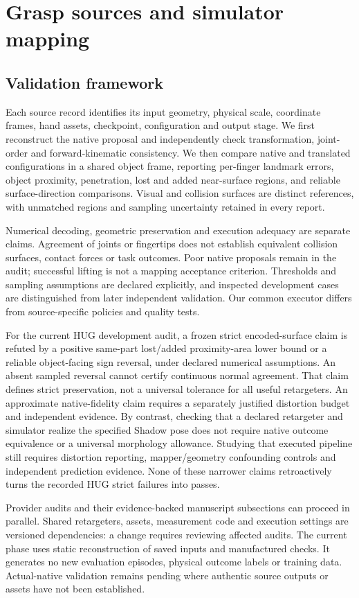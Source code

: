\section{Grasp sources and simulator mapping}
\subsection{Validation framework}
Each source record identifies its input geometry, physical scale, coordinate
frames, hand assets, checkpoint, configuration and output stage. We first
reconstruct the native proposal and independently check transformation,
joint-order and forward-kinematic consistency. We then compare native and
translated configurations in a shared object frame, reporting per-finger
landmark errors, object proximity, penetration, lost and added near-surface
regions, and reliable surface-direction comparisons. Visual and collision
surfaces are distinct references, with unmatched regions and sampling uncertainty
retained in every report.

Numerical decoding, geometric preservation and execution adequacy are separate
claims. Agreement of joints or fingertips does not establish equivalent
collision surfaces, contact forces or task outcomes. Poor native proposals
remain in the audit; successful lifting is not a mapping acceptance criterion.
Thresholds and sampling assumptions are declared explicitly, and inspected
development cases are distinguished from later independent validation.
Our common executor differs from source-specific policies and quality tests.

For the current HUG development audit, a frozen strict encoded-surface claim
is refuted by a positive same-part lost/added proximity-area lower bound or a
reliable object-facing sign reversal, under declared numerical assumptions.
An absent sampled reversal cannot certify continuous normal agreement. That
claim defines strict preservation, not a universal tolerance for all useful
retargeters. An approximate native-fidelity claim requires a separately
justified distortion budget and independent evidence. By contrast, checking
that a declared retargeter and simulator realize the specified Shadow pose
does not require native outcome equivalence or a universal morphology
allowance. Studying that executed pipeline still requires distortion reporting,
mapper/geometry confounding controls and independent prediction evidence.
None of these narrower claims retroactively turns the recorded HUG strict
failures into passes.

Provider audits and their evidence-backed manuscript subsections can proceed
in parallel. Shared retargeters, assets, measurement code and execution settings
are versioned dependencies: a change requires reviewing affected audits.
The current phase uses static reconstruction of saved inputs and manufactured
checks. It generates no new evaluation episodes, physical outcome labels or
training data. Actual-native validation remains pending where authentic source
outputs or assets have not been established.

